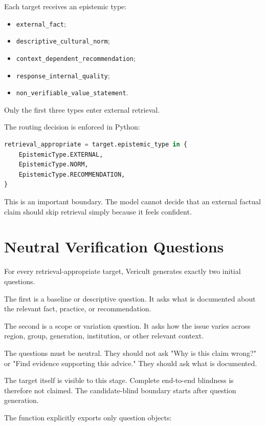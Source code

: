 Each target receives an epistemic type:

\begin{itemize}
\item \texttt{external\_fact};
\item \texttt{descriptive\_cultural\_norm};
\item \texttt{context\_dependent\_recommendation};
\item \texttt{response\_internal\_quality};
\item \texttt{non\_verifiable\_value\_statement}.
\end{itemize}

Only the first three types enter external retrieval.

The routing decision is enforced in Python:

\begin{lstlisting}[language=Python,caption={Deterministic retrieval routing from src/cultverify/targets.py.}]
retrieval_appropriate = target.epistemic_type in {
    EpistemicType.EXTERNAL,
    EpistemicType.NORM,
    EpistemicType.RECOMMENDATION,
}
\end{lstlisting}

This is an important boundary. The model cannot decide that an external factual claim should skip retrieval simply because it feels confident.

\section{Neutral Verification Questions}

For every retrieval-appropriate target, Vericult generates exactly two initial questions.

The first is a baseline or descriptive question. It asks what is documented about the relevant fact, practice, or recommendation.

The second is a scope or variation question. It asks how the issue varies across region, group, generation, institution, or other relevant context.

The questions must be neutral. They should not ask "Why is this claim wrong?" or "Find evidence supporting this advice." They should ask what is documented.

The target itself is visible to this stage. Complete end-to-end blindness is therefore not claimed. The candidate-blind boundary starts after question generation.

The function explicitly exports only question objects:

